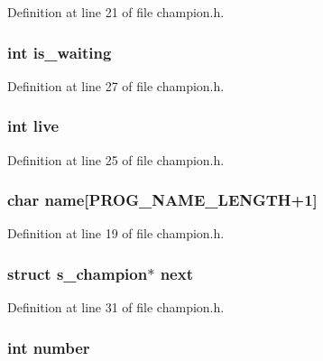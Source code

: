 Definition at line 21 of file champion.\-h.

\hypertarget{structs__champion_aa3d81fb1fe67fe93e9095477c8914837}{
\subsubsection[{is\-\_\-waiting}]{\setlength{\rightskip}{0pt plus 5cm}int is\-\_\-waiting}}\label{structs__champion_aa3d81fb1fe67fe93e9095477c8914837}


Definition at line 27 of file champion.\-h.

\hypertarget{structs__champion_a2cb50263f0f7a37d88d397a1d0e66f3a}{
\subsubsection[{live}]{\setlength{\rightskip}{0pt plus 5cm}int live}}\label{structs__champion_a2cb50263f0f7a37d88d397a1d0e66f3a}


Definition at line 25 of file champion.\-h.

\hypertarget{structs__champion_a28dc0293f716f3fbb2d0bd1cb83f93a2}{
\subsubsection[{name}]{\setlength{\rightskip}{0pt plus 5cm}char name\mbox{[}{\bf P\-R\-O\-G\-\_\-\-N\-A\-M\-E\-\_\-\-L\-E\-N\-G\-T\-H}+1\mbox{]}}}\label{structs__champion_a28dc0293f716f3fbb2d0bd1cb83f93a2}


Definition at line 19 of file champion.\-h.

\hypertarget{structs__champion_a2d18ffa3b1babc703aa8b1cd3812f7ad}{
\subsubsection[{next}]{\setlength{\rightskip}{0pt plus 5cm}struct {\bf s\-\_\-champion}$\ast$ next}}\label{structs__champion_a2d18ffa3b1babc703aa8b1cd3812f7ad}


Definition at line 31 of file champion.\-h.

\hypertarget{structs__champion_a7106e2abc437ad981830d14176d15f09}{
\subsubsection[{number}]{\setlength{\rightskip}{0pt plus 5cm}int number}}\label{structs__champion_a7106e2abc437ad981830d14176d15f09}


